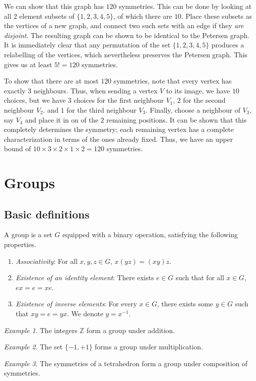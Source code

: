 \documentclass[11pt]{article}
\newcommand{\Z}{\mathbb{Z}}
\theoremstyle{definition}
\theoremstyle{remark}
\newtheorem*{example}{Example}
\numberwithin{equation}{section}
\begin{document}
    We can show that this graph has $120$ symmetries. This can be done by looking at
    all $2$ element subsets of $\{1, 2, 3, 4, 5\}$, of which there are $10$. Place
    these subsets as the vertices of a new graph, and connect two such sets with an
    edge if they \emph{are disjoint}. The resulting graph can be shown to be
    identical to the Petersen graph. It is immediately clear that any permutation of
    the set $\{1, 2, 3, 4, 5\}$ produces a relabelling of the vertices, which
    nevertheless preserves the Petersen graph. This gives us at least $5! = 120$
    symmetries.

    To show that there are at most $120$ symmetries, note that every vertex has
    exactly 3 neighbours. Thus, when sending a vertex $V$ to its image, we have $10$
    choices, but we have $3$ choices for the first neighbour $V_1$, $2$ for the
    second neighbour $V_2$. and $1$ for the third neighbour $V_3$. Finally, choose a
    neighbour of $V_3$, say $V_4$ and place it in on of the $2$ remaining positions.
    It can be shown that this completely determines the symmetry; each remaining
    vertex has a complete characterization in terms of the ones already fixed. Thus,
    we have an upper bound of $10 \times 3 \times 2 \times 1 \times 2 = 120$
    symmetries.
    

    \section{Groups}
    \subsection{Basic definitions}

    \begin{definition}
        A group is a set $G$ equipped with a binary operation, satisfying the
        following properties.
        \begin{enumerate}
        \itemsep0em
            \item \emph{Associativity}: For all $x, y, z \in G$, $x(yz) = (xy)z$.
            \item \emph{Existence of an identity element}: There exists $e \in G$
            such that for all $x \in G$, $ex = e = xe$.
            \item \emph{Existence of inverse elements}: For every $x \in G$, there
            exists some $y \in G$ such that $xy = e = yx$. We denote $y = x^{-1}$.
        \end{enumerate}
    \end{definition}
    \begin{example}
        The integers $\Z$ form a group under addition.
    \end{example}
    \begin{example}
        The set $\{-1, +1\}$ forms a group under multiplication.
    \end{example}
    \begin{example}
        The symmetries of a tetrahedron form a group under composition of symmetries.
    \end{example}
\end{document}
